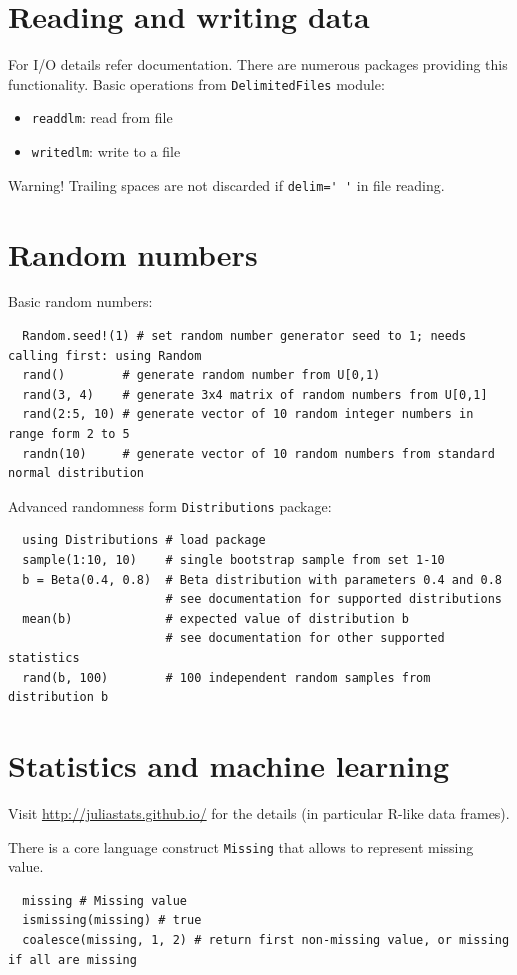 \documentclass[10pt,a4paper]{article}
\begin{document}
\section{Reading and writing data}
For I/O details refer documentation. There are numerous packages providing this
functionality. Basic operations from \lstinline|DelimitedFiles| module:
\begin{itemize}
  \item \lstinline|readdlm|: read from file
  \item \lstinline|writedlm|: write to a file
\end{itemize}

Warning! Trailing spaces are not discarded if \lstinline|delim=' '| in file reading.

\section{Random numbers}
Basic random numbers:
\begin{lstlisting}
  Random.seed!(1) # set random number generator seed to 1; needs calling first: using Random
  rand()        # generate random number from U[0,1)
  rand(3, 4)    # generate 3x4 matrix of random numbers from U[0,1]
  rand(2:5, 10) # generate vector of 10 random integer numbers in range form 2 to 5
  randn(10)     # generate vector of 10 random numbers from standard normal distribution
\end{lstlisting}

Advanced randomness form \lstinline|Distributions| package:
\begin{lstlisting}
  using Distributions # load package
  sample(1:10, 10)    # single bootstrap sample from set 1-10
  b = Beta(0.4, 0.8)  # Beta distribution with parameters 0.4 and 0.8
                      # see documentation for supported distributions
  mean(b)             # expected value of distribution b
                      # see documentation for other supported statistics
  rand(b, 100)        # 100 independent random samples from distribution b
\end{lstlisting}

\section{Statistics and machine learning}
Visit \url{http://juliastats.github.io/} for the details (in particular R-like
data frames).

There is a core language construct \lstinline|Missing| that allows to represent
missing value.
\begin{lstlisting}
  missing # Missing value
  ismissing(missing) # true
  coalesce(missing, 1, 2) # return first non-missing value, or missing if all are missing
\end{lstlisting}
\end{document}
